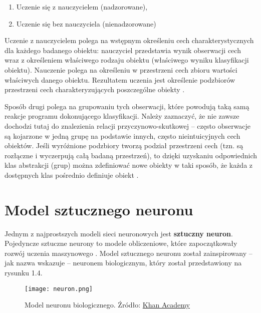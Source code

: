 \begin{enumerate}[leftmargin=2\parindent] %
    \item Uczenie się z nauczycielem (nadzorowane),
    \item Uczenie się bez nauczyciela (nienadzorowane)
\end{enumerate}

Uczenie z nauczycielem polega na wstępnym określeniu cech charakterystycznych dla każdego badanego obiektu: nauczyciel przedstawia wynik obserwacji cech wraz z określeniem właściwego rodzaju obiektu (właściwego wyniku klasyfikacji obiektu). Nauczenie polega na określeniu w przestrzeni cech zbioru wartości właściwych danego obiektu. Rezultatem uczenia jest określenie podzbiorów przestrzeni cech charakteryzujących poszczególne obiekty \citep[s. 8]{Kwiatkowski2007}.

Sposób drugi polega na grupowaniu tych obserwacji, które powodują taką samą reakcje programu dokonującego klasyfikacji. Należy zaznaczyć, że nie zawsze dochodzi tutaj do znalezienia relacji przyczynowo-skutkowej -- często obserwacje są kojarzone w jedną grupę na podstawie innych, często nieintuicyjnych cech obiektów.
Jeśli wyróżnione podzbiory tworzą podział przestrzeni cech (tzn. są rozłączne i wyczerpują całą badaną przestrzeń), to dzięki uzyskaniu odpowiednich klas abstrakcji (grup) można zdefiniować nowe obiekty w taki sposób, że każda z dostępnych klas pośrednio definiuje obiekt \citep[s. 8-9]{Kwiatkowski2007}.

\section{Model sztucznego neuronu}
Jednym z najprostszych modeli sieci neuronowych jest \textbf{sztuczny neuron}. Pojedyncze sztuczne neurony to modele obliczeniowe, które zapoczątkowały rozwój uczenia maszynowego \citep[s. 39]{Raschka_2019}.
Model sztucznego neuronu został zainspirowany -- jak nazwa wskazuje -- neuronem biologicznym, który został przedstawiony na rysunku 1.4.
\begin{figure}[H]
\begin{center}
\texttt{[image: neuron.png]}
\caption{Model neuronu biologicznego. Źródło: \href{https://pl.khanacademy.org/science/biology/human-biology/neuron-nervous-system/a/overview-of-neuron-structure-and-function}{Khan Academy}}
\centering
\end{center}
\end{figure}

